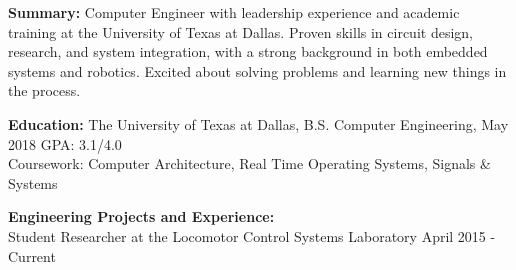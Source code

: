 \documentclass[11pt]{article}
\begin{document}
\thispagestyle{empty}

\textbf{Summary:} Computer Engineer with leadership experience and academic training at the University of Texas at Dallas. Proven skills in circuit design, research, and system integration, with a strong background in both embedded systems and robotics. Excited about solving problems and learning new things in the process.

\vspace{0.75em}
\textbf{Education:} The University of Texas at Dallas, B.S. Computer Engineering, May 2018
\hfill
GPA: 3.1/4.0 \\
Coursework: Computer Architecture, Real Time Operating Systems, Signals \& Systems

\vspace{0.75em}
\textbf{Engineering Projects and Experience:}\\

Student Researcher at the Locomotor Control Systems Laboratory
\hfill %
April 2015 - Current
\end{document}
